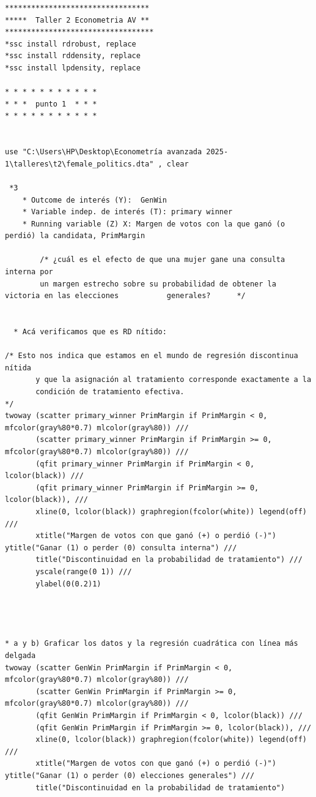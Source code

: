 \documentclass[a4paper, answers, addpoints, 11pt]{exam}
\begin{document}
\begin{verbatim}
*********************************
*****  Taller 2 Econometria AV **
**********************************
*ssc install rdrobust, replace
*ssc install rddensity, replace
*ssc install lpdensity, replace

* * * * * * * * * * * 
* * *  punto 1  * * * 
* * * * * * * * * * * 


use "C:\Users\HP\Desktop\Econometría avanzada 2025-1\talleres\t2\female_politics.dta" , clear

 *3 
    * Outcome de interés (Y):  GenWin
	* Variable indep. de interés (T): primary winner
	* Running variable (Z) X: Margen de votos con la que ganó (o perdió) la candidata, PrimMargin
	
		/* ¿cuál es el efecto de que una mujer gane una consulta interna por
		un margen estrecho sobre su probabilidad de obtener la victoria en las elecciones 	 		generales?		*/

 
  * Acá verificamos que es RD nítido: 
  
/* Esto nos indica que estamos en el mundo de regresión discontinua nítida 
 	   y que la asignación al tratamiento corresponde exactamente a la 
	   condición de tratamiento efectiva.									   */
twoway (scatter primary_winner PrimMargin if PrimMargin < 0, mfcolor(gray%80*0.7) mlcolor(gray%80)) /// 
       (scatter primary_winner PrimMargin if PrimMargin >= 0, mfcolor(gray%80*0.7) mlcolor(gray%80)) /// 
       (qfit primary_winner PrimMargin if PrimMargin < 0, lcolor(black)) /// 
       (qfit primary_winner PrimMargin if PrimMargin >= 0, lcolor(black)), /// 
       xline(0, lcolor(black)) graphregion(fcolor(white)) legend(off) /// 
       xtitle("Margen de votos con que ganó (+) o perdió (-)") ytitle("Ganar (1) o perder (0) consulta interna") ///
       title("Discontinuidad en la probabilidad de tratamiento") ///
       yscale(range(0 1)) /// 
       ylabel(0(0.2)1)

	   
	   

* a y b) Graficar los datos y la regresión cuadrática con línea más delgada
twoway (scatter GenWin PrimMargin if PrimMargin < 0, mfcolor(gray%80*0.7) mlcolor(gray%80)) /// 
       (scatter GenWin PrimMargin if PrimMargin >= 0, mfcolor(gray%80*0.7) mlcolor(gray%80)) /// 
       (qfit GenWin PrimMargin if PrimMargin < 0, lcolor(black)) /// 
       (qfit GenWin PrimMargin if PrimMargin >= 0, lcolor(black)), /// 
       xline(0, lcolor(black)) graphregion(fcolor(white)) legend(off) /// 
       xtitle("Margen de votos con que ganó (+) o perdió (-)") ytitle("Ganar (1) o perder (0) elecciones generales") ///
       title("Discontinuidad en la probabilidad de tratamiento") 
	   

\end{verbatim}
\end{document}
